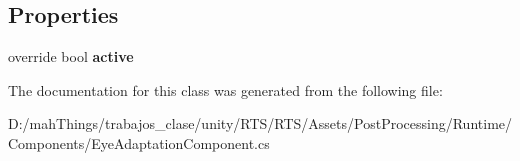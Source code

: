 \subsection*{Properties}
\begin{DoxyCompactItemize}
\item 
\mbox{\label{class_unity_engine_1_1_post_processing_1_1_eye_adaptation_component_ae4f7d376419dd90448617b828a9b1238}} 
override bool {\bfseries active}
\end{DoxyCompactItemize}


The documentation for this class was generated from the following file\+:\begin{DoxyCompactItemize}
\item 
D\+:/mah\+Things/trabajos\+\_\+clase/unity/\+R\+T\+S/\+R\+T\+S/\+Assets/\+Post\+Processing/\+Runtime/\+Components/Eye\+Adaptation\+Component.\+cs\end{DoxyCompactItemize}
